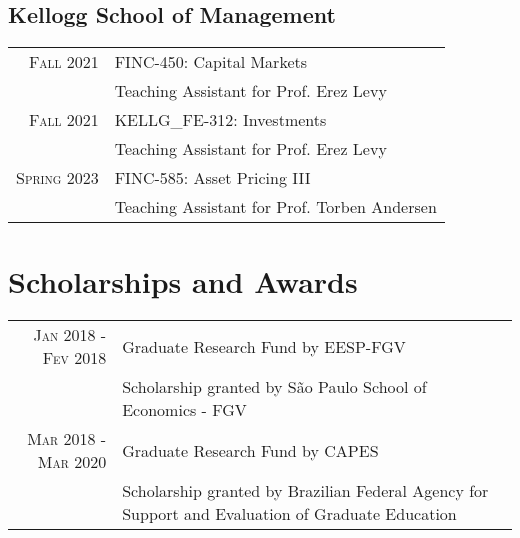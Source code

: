 \documentclass[a4paper,10pt]{article}
\begin{document}
\subsection{Kellogg School of Management}
\begin{tabular}{r|p{10.5cm}}
    \textsc{Fall} 2021 & FINC-450: Capital Markets \\
    & \footnotesize{Teaching Assistant for Prof. Erez Levy} \\
    \textsc{Fall} 2021 & KELLG\_FE-312: Investments \\
    & \footnotesize{Teaching Assistant for Prof. Erez Levy} \\
    \textsc{Spring} 2023 & FINC-585: Asset Pricing III \\
    & \footnotesize{Teaching Assistant for Prof. Torben Andersen} \\
\end{tabular}

\section{Scholarships and Awards}
\begin{tabular}{r|p{10.5cm}}
    \textsc{Jan} 2018 - \textsc{Fev} 2018 & Graduate Research Fund by EESP-FGV\\
    &\footnotesize{Scholarship granted by São Paulo School of Economics - FGV}
    \\
    \textsc{Mar} 2018 - \textsc{Mar} 2020 & Graduate Research Fund by CAPES\\
    &\footnotesize{Scholarship granted by Brazilian Federal Agency for Support and Evaluation of Graduate Education}
\end{tabular}
\end{document}
